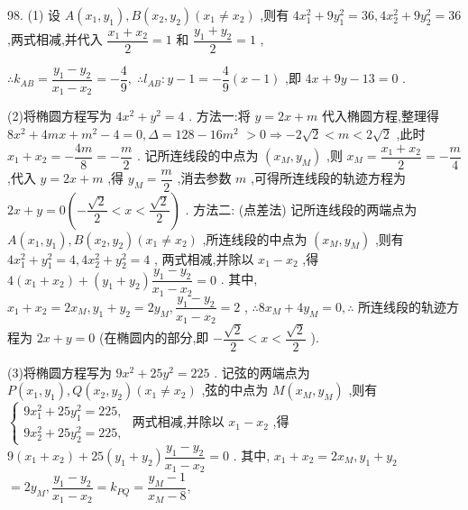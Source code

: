 98. (1) 设 $A\left( {{x}_{1},{y}_{1}}\right) ,B\left( {{x}_{2},{y}_{2}}\right) \left( {{x}_{1} \neq  {x}_{2}}\right)$ ,则有 $4{x}_{1}^{2} + 9{y}_{1}^{2} = {36},4{x}_{2}^{2} + 9{y}_{2}^{2} = {36}$ ,两式相减,并代入 $\dfrac{{x}_{1} + {x}_{2}}{2} = 1$ 和 $\dfrac{{y}_{1} + {y}_{2}}{2} = 1$ ,

$\therefore {k}_{AB} = \dfrac{{y}_{1} - {y}_{2}}{{x}_{1} - {x}_{2}} =  - \dfrac{4}{9},\;\therefore {l}_{AB} : y - 1 =  - \dfrac{4}{9}\left( {x - 1}\right)$ ,即 ${4x} + {9y} - {13} = 0$ .

(2)将椭圆方程写为 $4{x}^{2} + {y}^{2} = 4$ . 方法一:将 $y = {2x} + m$ 代入椭圆方程,整理得 $8{x}^{2} + {4mx} + {m}^{2} - 4 = 0,\Delta  = {128} - {16}{m}^{2}$  $> 0 \Rightarrow   - 2\sqrt{2} < m < 2\sqrt{2}$ ,此时 ${x}_{1} + {x}_{2} =  - \dfrac{4m}{8} =  - \dfrac{m}{2}$ . 记所连线段的中点为 $\left( {{x}_{M},{y}_{M}}\right)$ ,则 ${x}_{M} = \dfrac{{x}_{1} + {x}_{2}}{2} =  - \dfrac{m}{4}$ ,代入 $y = {2x} + m$ ,得 ${y}_{M} = \dfrac{m}{2}$ ,消去参数 $m$ ,可得所连线段的轨迹方程为 ${2x} + y = 0\left( {-\dfrac{\sqrt{2}}{2} < x < \dfrac{\sqrt{2}}{2}}\right)$ . 方法二: (点差法) 记所连线段的两端点为 $A\left( {{x}_{1},{y}_{1}}\right) ,B\left( {{x}_{2},{y}_{2}}\right) \left( {{x}_{1} \neq  {x}_{2}}\right)$ ,所连线段的中点为 $\left( {{x}_{M},{y}_{M}}\right)$ ,则有 $4{x}_{1}^{2} + {y}_{1}^{2} = 4,4{x}_{2}^{2} + {y}_{2}^{2} = 4$ , 两式相减,并除以 ${x}_{1} - {x}_{2}$ ,得 $4\left( {{x}_{1} + {x}_{2}}\right)  + \left( {{y}_{1} + {y}_{2}}\right) \dfrac{{y}_{1} - {y}_{2}}{{x}_{1} - {x}_{2}} = 0$ . 其中, ${x}_{1} + {x}_{2} = 2{x}_{M},{y}_{1} + {y}_{2} = 2{y}_{M},\dfrac{{y}_{1} - {y}_{2}}{{x}_{1} - {x}_{2}} = 2$ , $\therefore 8{x}_{M} + 4{y}_{M} = 0,\therefore$ 所连线段的轨迹方程为 ${2x} + y = 0$ (在椭圆内的部分,即 $- \dfrac{\sqrt{2}}{2} < x < \dfrac{\sqrt{2}}{2}$ ).

(3)将椭圆方程写为 $9{x}^{2} + {25}{y}^{2} = {225}$ . 记弦的两端点为 $P\left( {{x}_{1},{y}_{1}}\right) ,Q\left( {{x}_{2},{y}_{2}}\right) \left( {{x}_{1} \neq  {x}_{2}}\right)$ ,弦的中点为 $M\left( {{x}_{M},{y}_{M}}\right)$ ,则有 $\left\{  \begin{array}{l} 9{x}_{1}^{2} + {25}{y}_{1}^{2} = {225}, \\  9{x}_{2}^{2} + {25}{y}_{2}^{2} = {225}, \end{array}\right.$ 两式相减,并除以 ${x}_{1} - {x}_{2}$ ,得 $9\left( {{x}_{1} + {x}_{2}}\right)  + {25}\left( {{y}_{1} + {y}_{2}}\right) \dfrac{{y}_{1} - {y}_{2}}{{x}_{1} - {x}_{2}} = 0$ . 其中, ${x}_{1} + {x}_{2} = 2{x}_{M},{y}_{1} + {y}_{2}$  $= 2{y}_{M},\dfrac{{y}_{1} - {y}_{2}}{{x}_{1} - {x}_{2}} = {k}_{PQ} = \dfrac{{y}_{M} - 1}{{x}_{M} - 8},$

